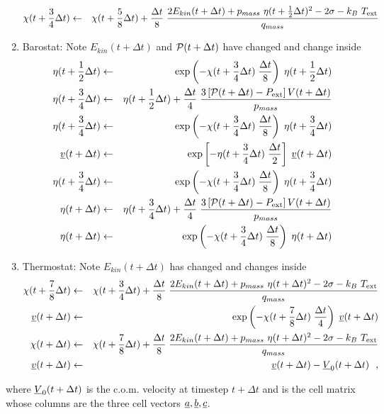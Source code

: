\begin{enumerate}
\begin{eqnarray}
\chi (t + {3 \over 4} \Delta t) &\leftarrow& \chi (t + {5 \over 8} \Delta t) +
{\Delta t \over 8} \; {{2 E_{kin}(t + \Delta t) + p_{mass}~\eta (t + {1 \over 2} \Delta t)^{2} -
2 \sigma - k_{B}~T_{\rm ext}} \over q_{mass}} \nonumber
\end{eqnarray}
\item Barostat: Note $E_{kin}(t + \Delta t)$ and ${\cal P}(t + \Delta t)$
have changed and change inside
\begin{eqnarray}
\eta (t + {1 \over 2} \Delta t) &\leftarrow& \exp \left( -\chi (t + {3 \over 4} \Delta t) \;
{\Delta t \over 8} \right) \; \eta (t + {1 \over 2} \Delta t) \nonumber \\
\eta (t + {3 \over 4} \Delta t) &\leftarrow& \eta (t + {1 \over 2} \Delta t) + {\Delta t \over 4} \;
{3 \left[ {\cal P}(t + \Delta t) - P_{\rm ext} \right] V(t + \Delta t) \over p_{mass}} \nonumber \\
\eta (t + {3 \over 4} \Delta t) &\leftarrow& \exp \left( -\chi (t + {3 \over 4} \Delta t) \;
{\Delta t \over 8} \right) \; \eta (t + {3 \over 4} \Delta t) \nonumber \\
\mbox{$\underline{v}$}(t + \Delta t) &\leftarrow& \exp \left[ -\eta (t + {3 \over 4} \Delta t) \;
{\Delta t \over 2} \right] \; \mbox{$\underline{v}$}(t + \Delta t) \\
\eta (t + {3 \over 4} \Delta t) &\leftarrow& \exp \left( -\chi (t + {3 \over 4} \Delta t) \;
{\Delta t \over 8} \right) \; \eta (t + {3 \over 4} \Delta t) \nonumber \\
\eta (t + \Delta t) &\leftarrow& \eta (t + {3 \over 4} \Delta t) + {\Delta t \over 4} \;
{3 \left[ {\cal P}(t + \Delta t) - P_{\rm ext} \right] V(t + \Delta t) \over p_{mass}} \nonumber \\
\eta (t + \Delta t) &\leftarrow& \exp \left( -\chi (t + {3 \over 4} \Delta t) \;
{\Delta t \over 8} \right) \; \eta (t + \Delta t) \nonumber
\end{eqnarray}
\item Thermostat: Note $E_{kin}(t + \Delta t)$ has changed and changes inside
\begin{eqnarray}
\chi (t + {7 \over 8} \Delta t) &\leftarrow& \chi (t + {3 \over 4} \Delta t) +
{\Delta t \over 8} \; {{2 E_{kin}(t + \Delta t) + p_{mass}~\eta (t + \Delta t)^{2} -
2 \sigma - k_{B}~T_{\rm ext}} \over q_{mass}} \nonumber \\
\mbox{$\underline{v}$}(t + \Delta t) &\leftarrow& \exp \left(-\chi (t + {7 \over 8} \Delta t) \;
{\Delta t \over 4} \right) \; \mbox{$\underline{v}$}(t + \Delta t) \\
\chi (t + \Delta t) &\leftarrow& \chi (t + {7 \over 8} \Delta t) +
{\Delta t \over 8} \; {{2 E_{kin}(t + \Delta t) + p_{mass}~\eta (t + \Delta t)^{2} -
2 \sigma - k_{B}~T_{\rm ext}} \over q_{mass}} \nonumber \\
\mbox{$\underline{v}$}(t + \Delta t) &\leftarrow& \mbox{$\underline{v}$}(t + \Delta t) - \mbox{$\underline{V}$}_{0}(t + \Delta t)~~, \nonumber
\end{eqnarray}
\end{enumerate}
where $\mbox{$\underline{V}$}_{0}(t + \Delta t)$ is the c.o.m.  velocity at timestep
$t + \Delta t$ and  is the cell matrix whose columns are the
three cell vectors $\mbox{$\underline{a}$}, \mbox{$\underline{b}$}, \mbox{$\underline{c}$}$.

